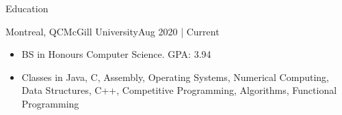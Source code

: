 \documentclass[]{mcdowellcv}
\begin{document}
\makeheader

\begin{cvsection}{Education}
	\begin{cvsubsection}{Montreal, QC}{McGill University}{Aug 2020 | Current}
	\vspace{-1.5mm}
		\begin{itemize}
			\item BS in Honours Computer Science. GPA: 3.94
			\item Classes in Java, C, Assembly, Operating Systems, Numerical Computing, Data Structures, C++, Competitive Programming, Algorithms, Functional Programming
		\end{itemize}
	\vspace{-1.5mm}
	\end{cvsubsection}
\end{cvsection}
\end{document}

